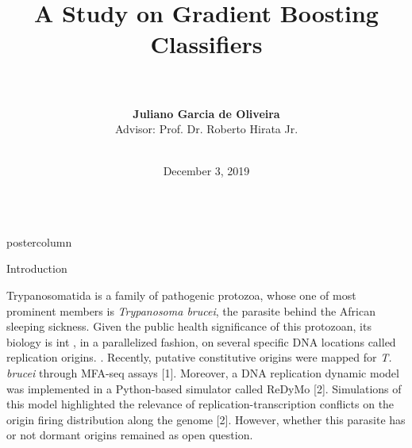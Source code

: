 \documentclass[final,hyperref={pdfpagelabels=false}]{beamer}
\title{\huge\textbf{A Study on Gradient Boosting Classifiers}\\$\phantom{a}$\bigskip\bigskip
}
\author{\textbf{Juliano Garcia de Oliveira}\\Advisor: Prof. Dr. Roberto Hirata Jr.\\$\phantom{a}$\bigskip\bigskip}
\institute[IME-USP]{\large{Department of Computer Science -- Institute of Mathematics and Statistics \\ University of São Paulo}}
\date[December, 2019]{December 3, 2019}
\newlength{\columnheight}
\begin{document}
\begin{frame}

\begin{columns}

\begin{column}{.497\textwidth}
\begin{beamercolorbox}[center,wd=\textwidth]{postercolumn}
        
\begin{minipage}[T]{.95\textwidth}  %
                     
\parbox[t][\columnheight]{\textwidth}
{ 
                    
\begin{block}{Introduction}
\parbox[t][]{0.95\textwidth}  %
{     
\begin{myfont}
    

    Trypanosomatida is a family of pathogenic protozoa, whose one of most prominent members is {\em Trypanosoma brucei}, the parasite behind the African sleeping sickness. Given the public health significance of this protozoan, its biology is int
    , in a parallelized fashion, on several specific DNA locations called replication origins. . Recently, putative constitutive origins were mapped for {\em T. brucei} through MFA-seq assays [1]. Moreover, a DNA replication dynamic model was implemented in a Python-based simulator called ReDyMo [2]. Simulations of this model highlighted the relevance of replication-transcription conflicts on the origin firing distribution along the genome [2]. However, whether this parasite has or not dormant origins remained as open question.
\end{myfont}
}
\end{block}


}
\end{minipage}
\end{beamercolorbox}
\end{column}
\end{columns}
\end{frame}
\end{document}
